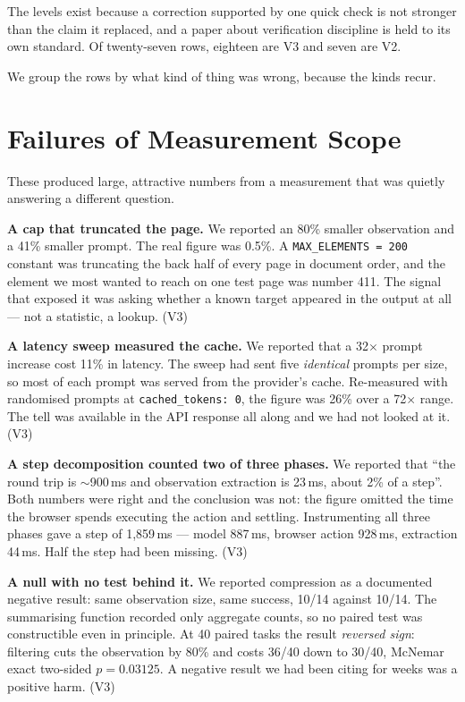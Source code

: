 \documentclass[conference]{IEEEtran}
\begin{document}
The levels exist because a correction supported by one quick check is not
stronger than the claim it replaced, and a paper about verification discipline
is held to its own standard. Of twenty-seven rows, eighteen are V3 and seven
are V2.

We group the rows by what kind of thing was wrong, because the kinds recur.

\section{Failures of Measurement Scope}

These produced large, attractive numbers from a measurement that was quietly
answering a different question.

\textbf{A cap that truncated the page.} We reported an 80\% smaller
observation and a 41\% smaller prompt. The real figure was 0.5\%. A
\texttt{MAX\_ELEMENTS = 200} constant was truncating the back half of every
page in document order, and the element we most wanted to reach on one test
page was number 411. The signal that exposed it was asking whether a known
target appeared in the output at all --- not a statistic, a lookup. (V3)

\textbf{A latency sweep measured the cache.} We reported that a 32$\times$
prompt increase cost 11\% in latency. The sweep had sent five \emph{identical}
prompts per size, so most of each prompt was served from the provider's cache.
Re-measured with randomised prompts at \texttt{cached\_tokens: 0}, the figure
was 26\% over a 72$\times$ range. The tell was available in the API response
all along and we had not looked at it. (V3)

\textbf{A step decomposition counted two of three phases.} We reported that
``the round trip is $\sim$900\,ms and observation extraction is 23\,ms, about
2\% of a step''. Both numbers were right and the conclusion was not: the figure
omitted the time the browser spends executing the action and settling.
Instrumenting all three phases gave a step of 1{,}859\,ms --- model 887\,ms,
browser action 928\,ms, extraction 44\,ms. Half the step had been missing. (V3)

\textbf{A null with no test behind it.} We reported compression as a documented
negative result: same observation size, same success, 10/14 against 10/14. The
summarising function recorded only aggregate counts, so no paired test was
constructible even in principle. At 40 paired tasks the result \emph{reversed
sign}: filtering cuts the observation by 80\% and costs 36/40 down to 30/40,
McNemar exact two-sided $p = 0.03125$. A negative result we had been citing for
weeks was a positive harm. (V3)
\end{document}
